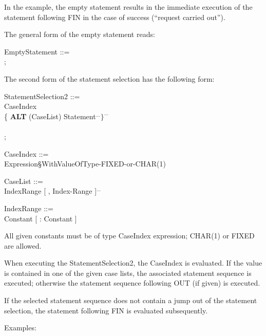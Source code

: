 In the example, the empty statement results in the immediate execution
of the statement following FIN in the case of success (``request carried
out'').

The general form of the empty statement reads:

EmptyStatement ::=\\
\x ;

The second form of the statement selection has the following form:

StatementSelection2 ::= \\
 CaseIndex\\
\x \{ {\bf ALT} (CaseList) Statement$^{...} \}^{...}$ \\
 \\
;

CaseIndex ::=\\
\x Expression\S WithValueOfType-FIXED-or-CHAR(1)

CaseList ::= \\
\x IndexRange [ , Index-Range ]$^{...}$

IndexRange ::= \\
\x Constant [ : Constant ]

All given constants must be of type CaseIndex expression; CHAR(1) or
FIXED are allowed.

When executing the StatementSelection2, the CaseIndex is evaluated.
If the value is contained in one of the given case lists, the associated
statement sequence is executed; otherwise the statement sequence
following OUT (if given) is executed.

If the selected statement sequence does not contain a jump out of the
statement selection, the statement following FIN is evaluated
subsequently.

Examples:

